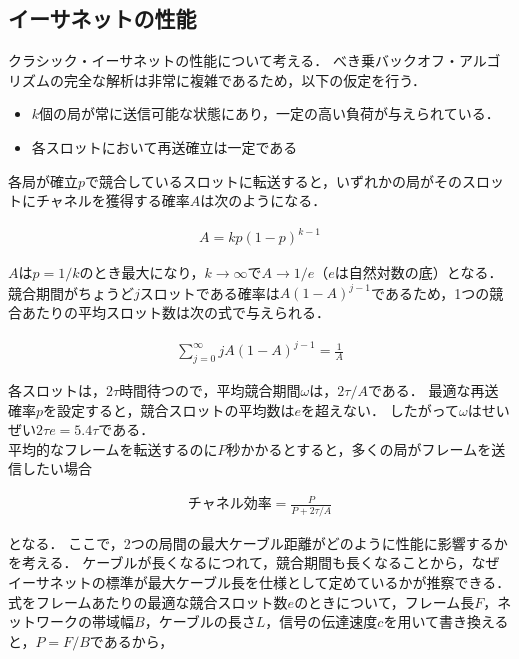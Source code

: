 \documentclass[a4paper]{ltjsarticle}
\begin{document}
\subsection{イーサネットの性能}\label{ux30a4ux30fcux30b5ux30cdux30c3ux30c8ux306eux6027ux80fd}

クラシック・イーサネットの性能について考える．
べき乗バックオフ・アルゴリズムの完全な解析は非常に複雑であるため，以下の仮定を行う．

\begin{itemize}
\item
  \(k\)個の局が常に送信可能な状態にあり，一定の高い負荷が与えられている．
\item
  各スロットにおいて再送確立は一定である
\end{itemize}

各局が確立\(p\)で競合しているスロットに転送すると，いずれかの局がそのスロットにチャネルを獲得する確率\(A\)は次のようになる．

\begin{align}
  A = kp(1-p)^{k-1}
\end{align}

\(A\)は\(p=1/k\)のとき最大になり，\(k \to \infty\)で\(A \to 1/e\)（\(e\)は自然対数の底）となる．
競合期間がちょうど\(j\)スロットである確率は\(A(1-A)^{j-1}\)であるため，1つの競合あたりの平均スロット数は次の式で与えられる．

\begin{align}
  \sum^{\infty}_{j=0} jA(1-A)^{j-1} = \frac{1}{A}
\end{align}

各スロットは，\(2 \tau\)時間待つので，平均競合期間\(\omega\)は，\(2 \tau / A\)である．
最適な再送確率\(p\)を設定すると，競合スロットの平均数は\(e\)を超えない．
したがって\(\omega\)はせいぜい\(2 \tau e = 5.4 \tau\)である．\\
平均的なフレームを転送するのに\(P\)秒かかるとすると，多くの局がフレームを送信したい場合

\begin{align}
  \text{チャネル効率} = \frac{P}{P + 2 \tau / A}
\end{align}

となる．
ここで，2つの局間の最大ケーブル距離がどのように性能に影響するかを考える．
ケーブルが長くなるにつれて，競合期間も長くなることから，なぜイーサネットの標準が最大ケーブル長を仕様として定めているかが推察できる．\\
式をフレームあたりの最適な競合スロット数\(e\)のときについて，フレーム長\(F\)，ネットワークの帯域幅\(B\)，ケーブルの長さ\(L\)，信号の伝達速度\(c\)を用いて書き換えると，\(P=F/B\)であるから，
\end{document}

